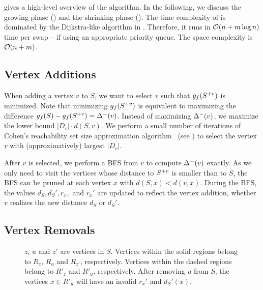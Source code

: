 

 gives a high-level overview of the \growshrink algorithm.
In the following, we discuss the growing phase
() and the shrinking phase
().
The time complexity of \growshrink is dominated by the Dijkstra-like algorithm in
. Therefore, it runs in $\mathcal{O}(n + m\log n)$
time per swap -- if using an appropriate priority queue.
The space complexity is $\mathcal{O}(n + m)$.

\subsection{Vertex Additions}
%
When adding a vertex $v$ to $S$, we want to select $v$ such that $g_f(S^{+v})$
is minimized. Note that minimizing $g_f(S^{+v})$ is equivalent to maximizing
the difference $g_f(S) - g_f(S^{+v}) = \Delta^-(v)$. Instead of maximizing
$\Delta^-(v)$, we maximize the lower bound $|D_v|\cdot d(S, v)$.
We perform a small number of iterations of Cohen's reachability set size
approximation algorithm~\cite{DBLP:journals/jcss/Cohen97}
(see ) to select the vertex $v$ with
(approximatively) largest $|D_v|$.

After $v$ is selected, we perform a BFS from $v$ to compute $\Delta^-(v)$
exactly. As we only need to visit the vertices whose distance to $S^{+v}$ is
smaller than to $S$, the BFS can be pruned at each vertex $x$ with $d(S, x) <
d(v, x)$. During the BFS, the values $d_S, d_S', r_x,$ and $r_x'$ are updated
to reflect the vertex addition, \ie whether $v$ realizes the new distance $d_S$
or $d_S'$.

\subsection{Vertex Removals}
%
\begin{figure}
\centering


\caption{$z$, $u$ and $z'$ are vertices in $S$. Vertices within the solid
regions belong to $R_z$, $R_u$ and $R_{z'}$, respectively. Vertices within
the dashed regions belong to $R'_z$ and $R'_u$, respectively. After
removing $u$ from $S$, the vertices $x \in R'_u$ will have an invalid
$r_x'$ and $d_S'(x)$.}
\label{fig:lsh-gc-boundary-pair}
\end{figure}

